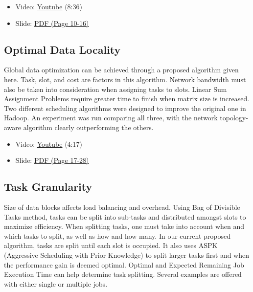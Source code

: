 \begin{itemize}
\tightlist
\item
  Video: \href{https://www.youtube.com/watch?v=RqLA7_asK50}{Youtube}
  (8:36)
\item
  Slide:
  \href{https://drive.google.com/open?id=0B88HKpainTSfT28zLTdKYWhGdGM}{PDF
  (Page 10-16)}
\end{itemize}

\subsection{Optimal Data Locality}\label{optimal-data-locality}

Global data optimization can be achieved through a proposed algorithm
given here. Task, slot, and cost are factors in this algorithm. Network
bandwidth must also be taken into consideration when assigning tasks to
slots. Linear Sum Assignment Problems require greater time to finish
when matrix size is increased. Two different scheduling algorithms were
designed to improve the original one in Hadoop. An experiment was run
comparing all three, with the network topology-aware algorithm clearly
outperforming the others.

\begin{itemize}
\tightlist
\item
  Video: \href{https://www.youtube.com/watch?v=Ok8vdrFXo5w}{Youtube}
  (4:17)
\item
  Slide:
  \href{https://drive.google.com/open?id=0B88HKpainTSfT28zLTdKYWhGdGM}{PDF
  (Page 17-28)}
\end{itemize}

\subsection{Task Granularity}\label{task-granularity}

Size of data blocks affects load balancing and overhead. Using Bag of
Divisible Tasks method, tasks can be split into sub-tasks and
distributed amongst slots to maximize efficiency. When splitting tasks,
one must take into account when and which tasks to split, as well as how
and how many. In our current proposed algorithm, tasks are split until
each slot is occupied. It also uses ASPK (Aggressive Scheduling with
Prior Knowledge) to split larger tasks first and when the performance
gain is deemed optimal. Optimal and Expected Remaining Job Execution
Time can help determine task splitting. Several examples are offered
with either single or multiple jobs.

